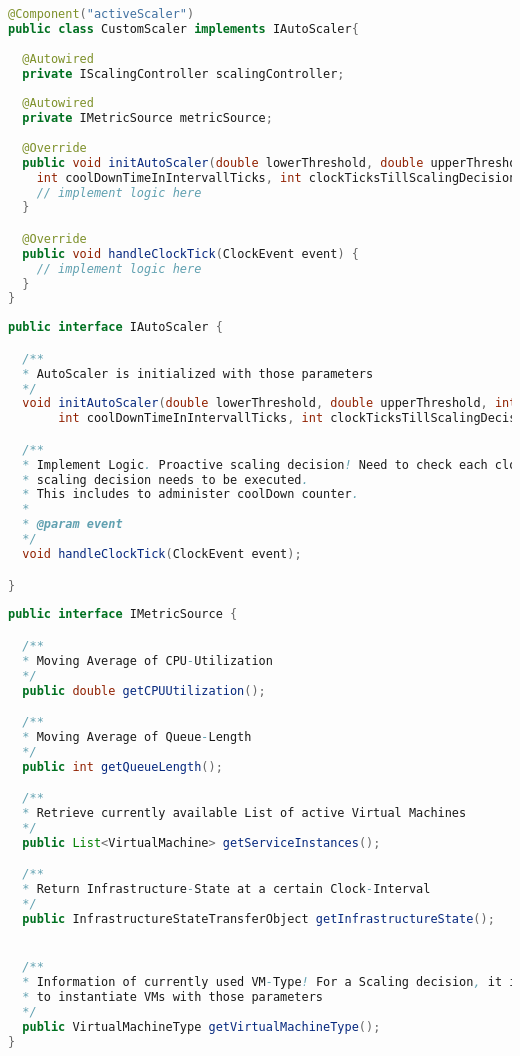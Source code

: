 \begin{lstlisting}[language=Java,firstnumber=1, caption={CustomScaler.java}, label=lst:customScaler]
@Component("activeScaler")
public class CustomScaler implements IAutoScaler{
  
  @Autowired
  private IScalingController scalingController;
  
  @Autowired
  private IMetricSource metricSource;
  
  @Override
  public void initAutoScaler(double lowerThreshold, double upperThreshold, int vmMin, int vmMax,
    int coolDownTimeInIntervallTicks, int clockTicksTillScalingDecision) {
    // implement logic here
  }

  @Override
  public void handleClockTick(ClockEvent event) {
    // implement logic here
  }
}
\end{lstlisting}




\begin{lstlisting}[language=Java,firstnumber=1, caption={IAutoScaler.java}, label=lst:scaler]
public interface IAutoScaler {

  /**
  * AutoScaler is initialized with those parameters
  */
  void initAutoScaler(double lowerThreshold, double upperThreshold, int vmMin, int vmMax,
       int coolDownTimeInIntervallTicks, int clockTicksTillScalingDecision);

  /**
  * Implement Logic. Proactive scaling decision! Need to check each clockTick if
  * scaling decision needs to be executed.
  * This includes to administer coolDown counter.
  * 
  * @param event
  */
  void handleClockTick(ClockEvent event);

}
\end{lstlisting}


\begin{lstlisting}[language=Java,firstnumber=1, caption={IMetricSource.java}, label=lst:metric]
public interface IMetricSource {

  /**
  * Moving Average of CPU-Utilization
  */
  public double getCPUUtilization();

  /**
  * Moving Average of Queue-Length
  */
  public int getQueueLength();

  /**
  * Retrieve currently available List of active Virtual Machines
  */
  public List<VirtualMachine> getServiceInstances();

  /**
  * Return Infrastructure-State at a certain Clock-Interval
  */
  public InfrastructureStateTransferObject getInfrastructureState();


  /**
  * Information of currently used VM-Type! For a Scaling decision, it is needed
  * to instantiate VMs with those parameters
  */
  public VirtualMachineType getVirtualMachineType();
}
\end{lstlisting}


